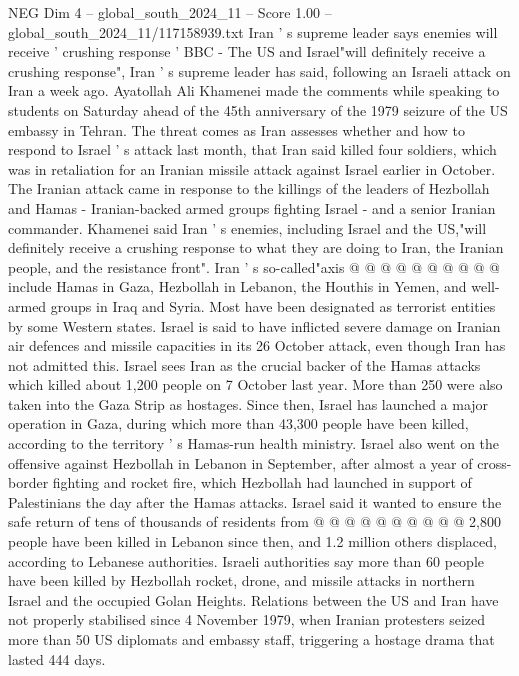 \begin{textsample}{NEG Dim 4 – global\_south\_2024\_11 – Score 1.00 – global\_south\_2024\_11/117158939.txt}  \label{ex:f4_neg_206}
Iran ' s supreme leader says enemies will receive ' crushing response ' BBC - The US and Israel"will definitely receive a crushing response", Iran ' s supreme leader has said, following an Israeli attack on Iran a week ago.
Ayatollah Ali Khamenei made the comments while speaking to students on Saturday ahead of the 45th anniversary of the 1979 seizure of the US embassy in Tehran.
The threat comes as Iran assesses whether and how to respond to Israel ' s attack last month, that Iran said killed four soldiers, which was in retaliation for an Iranian missile attack against Israel earlier in October.
The Iranian attack came in response to the killings of the leaders of Hezbollah and Hamas - Iranian-backed armed groups fighting Israel - and a senior Iranian commander.
Khamenei said Iran ' s enemies, including Israel and the US,"will definitely receive a crushing response to what they are doing to Iran, the Iranian people, and the resistance front".
Iran ' s so-called"axis @ @ @ @ @ @ @ @ @ @ include Hamas in Gaza, Hezbollah in Lebanon, the Houthis in Yemen, and well-armed groups in Iraq and Syria.
Most have been designated as terrorist entities by some Western states.
Israel is said to have inflicted severe damage on Iranian air defences and missile capacities in its 26 October attack, even though Iran has not admitted this.
Israel sees Iran as the crucial backer of the Hamas attacks which killed about 1,200 people on 7 October last year.
More than 250 were also taken into the Gaza Strip as hostages.
Since then, Israel has launched a major operation in Gaza, during which more than 43,300 people have been killed, according to the territory ' s Hamas-run health ministry.
Israel also went on the offensive against Hezbollah in Lebanon in September, after almost a year of cross-border fighting and rocket fire, which Hezbollah had launched in support of Palestinians the day after the Hamas attacks.
Israel said it wanted to ensure the safe return of tens of thousands of residents from @ @ @ @ @ @ @ @ @ @ 2,800 people have been killed in Lebanon since then, and 1.2 million others displaced, according to Lebanese authorities.
Israeli authorities say more than 60 people have been killed by Hezbollah rocket, drone, and missile attacks in northern Israel and the occupied Golan Heights.
Relations between the US and Iran have not properly stabilised since 4 November 1979, when Iranian protesters seized more than 50 US diplomats and embassy staff, triggering a hostage drama that lasted 444 days.

\end{textsample}
